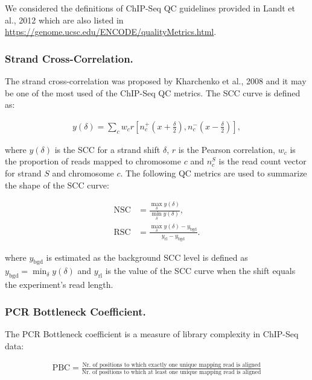 \documentclass{bmcart}\usepackage[]{graphicx}\usepackage[]{color}
\begin{document}
We considered the definitions of ChIP-Seq QC guidelines provided in
Landt et al., 2012 which are also listed in
\url{https://genome.ucsc.edu/ENCODE/qualityMetrics.html}.

\subsubsection*{Strand Cross-Correlation.}

The strand cross-correlation was proposed by Kharchenko et al., 2008
\cite{strandcc} and it may be one of the most used of the ChIP-Seq QC
metrics. The SCC curve is defined as:

\begin{align}
  y(\delta) = \sum_c w_c r\left[ n_c^+ \left(x + \frac{\delta}{2}
    \right), n_c^- \left( x- \frac{\delta}{2} \right)\right],
\label{scc}
\end{align}

where $y(\delta)$ is the SCC for a strand shift $\delta$, $r$ is the
Pearson correlation, $w_c$ is the proportion of reads mapped to
chromosome $c$ and $n_c^S$ is the read count vector for strand $S$ and
chromosome $c$. The following QC metrics are used to summarize the shape of the SCC curve:

\begin{align}
  \mbox{NSC} &= \frac{\max_\delta y(\delta)}{\min_\delta y(\delta)}, \label{nsc} \\
  \mbox{RSC} &= \frac{\max_\delta y(\delta) -
    y_{\text{bgd}}}{y_{\text{rl}} - y_{\text{bgd}}}. \label{rsc}
\end{align}

where $y_{\text{bgd}}$ is estimated as the background SCC level is
defined as $y_{\text{bgd}} = \min_\delta y(\delta)$ and $y_{\text{rl}}$
  is the value of the SCC curve when the shift equals the experiment's
  read length.

\subsubsection*{PCR Bottleneck Coefficient.}

The PCR Bottleneck coefficient is a measure of library complexity in
ChIP-Seq data:

\begin{align}
  \mbox{PBC} = \frac{\text{Nr. of positions to which exactly one
      unique mapping read is aligned}}{\text{Nr. of positions to
      which at least one unique mapping read is aligned}} \nonumber
\end{align}
\end{document}
